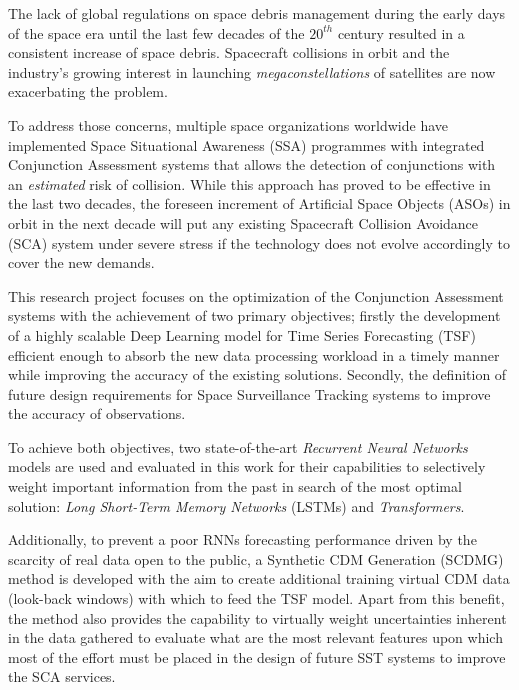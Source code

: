 

The lack of global regulations on space debris management during the early days of the space era until the last few decades of the $20^{th}$ century resulted in a consistent increase of space debris. Spacecraft collisions in orbit and the industry's growing interest in launching \textit{megaconstellations} of satellites are now exacerbating the problem.

To address those concerns, multiple space organizations worldwide have implemented Space Situational Awareness (SSA) programmes with integrated Conjunction Assessment systems that allows the detection of conjunctions with an \textit{estimated} risk of collision. While this approach has proved to be effective in the last two decades, the foreseen increment of Artificial Space Objects (ASOs) in orbit in the next decade will put any existing Spacecraft Collision Avoidance (SCA) system under severe stress if the technology does not evolve accordingly to cover the new demands.

This research project focuses on the optimization of the Conjunction Assessment systems with the achievement of two primary objectives; firstly the development of a highly scalable Deep Learning model for Time Series Forecasting (TSF) efficient enough to absorb the new data processing workload in a timely manner while improving the accuracy of the existing solutions. Secondly, the definition of future design requirements for Space Surveillance Tracking systems to improve the accuracy of observations.

To achieve both objectives, two state-of-the-art \textit{Recurrent Neural Networks} models are used and evaluated in this work for their capabilities to selectively weight important information from the past in search of the most optimal solution: \textit{Long Short-Term Memory Networks} (LSTMs) and \textit{Transformers}. 

Additionally, to prevent a poor RNNs forecasting performance driven by the scarcity of real data open to the public, a Synthetic CDM Generation (SCDMG) method is developed with the aim to create additional training virtual CDM data (look-back windows) with which to feed the TSF model. Apart from this benefit, the method also provides the capability to virtually weight uncertainties inherent in the data gathered to evaluate what are the most relevant features upon which most of the effort must be placed in the design of future SST systems to improve the SCA services.
